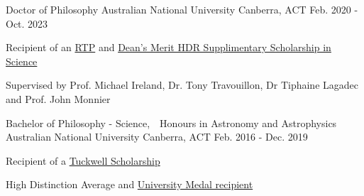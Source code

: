 

\begin{cventries}

  \cventry
    {Doctor of Philosophy} %
    {Australian National University} %
    {Canberra, ACT} %
    {Feb. 2020 - Oct. 2023} %
    {
      \begin{cvitems} %
        \item {Recipient of an \href{https://study.anu.edu.au/scholarships/find-scholarship/australian-government-research-training-program-agrtp-stipend}{RTP} and \href{https://study.anu.edu.au/scholarships/find-scholarship/deans-merit-hdr-supplementary-scholarship-science}{Dean's Merit HDR Supplimentary Scholarship in Science}}
        \item {Supervised by Prof. Michael Ireland, Dr. Tony Travouillon, Dr Tiphaine Lagadec and Prof. John Monnier}
      \end{cvitems}
    }
  \cventry
    {Bachelor of Philosophy - Science,\ \ Honours in Astronomy and Astrophysics} %
    {Australian National University} %
    {Canberra, ACT} %
    {Feb. 2016 - Dec. 2019} %
    {
      \begin{cvitems} %
        \item {Recipient of a \href{https://tuckwell.anu.edu.au/}{Tuckwell Scholarship}}
        \item {High Distinction Average and \href{https://www.anu.edu.au/students/program-administration/prizes/university-medal-and-postgraduate-medal-for-academic-excellence}{University Medal recipient}}
      \end{cvitems}
    }


\end{cventries}
